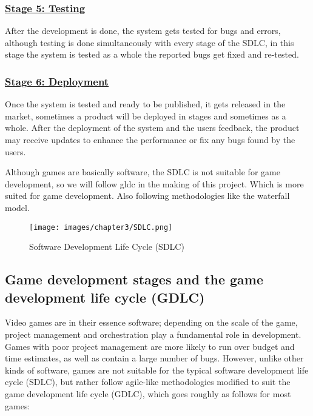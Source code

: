 \documentclass[../main.tex]{subfiles}
\begin{document}
\subsubsection*{\underline{Stage 5: Testing
}} 
After the development is done, the system gets tested for bugs and errors, although testing is done simultaneously with every stage of the SDLC, in this stage the system is tested as a whole the reported bugs get fixed and re-tested.
\subsubsection*{\underline{Stage 6: Deployment 
}} 
Once the system is tested and ready to be published, it gets released in the market, sometimes a product will be deployed in stages and sometimes as a whole. After the deployment of the system and the users feedback, the product may receive updates to enhance the performance or fix any bugs found by the users. 

Although games are basically software, the SDLC is not suitable for game development, so we will follow \acrfull{gldc} in the making of this project. Which is more suited for game development. Also following methodologies like the waterfall model. 

\begin{figure}[!ht]
\centering
\texttt{[image: images/chapter3/SDLC.png]}
\caption{Software Development Life Cycle (SDLC)}
\label{sdlc}
\end{figure}
\newpage
\subsection{Game development stages and the game development life cycle (GDLC)}
Video games are in their essence software; depending on the scale of the game, project management and orchestration play a fundamental role in development. Games with poor project management are more likely to run over budget and time estimates, as well as contain a large number of bugs. However, unlike other kinds of software, games are not suitable for the typical software development life cycle (SDLC), but rather follow agile-like methodologies modified to suit the game development life cycle (GDLC), which goes roughly as follows for most games:
\end{document}
